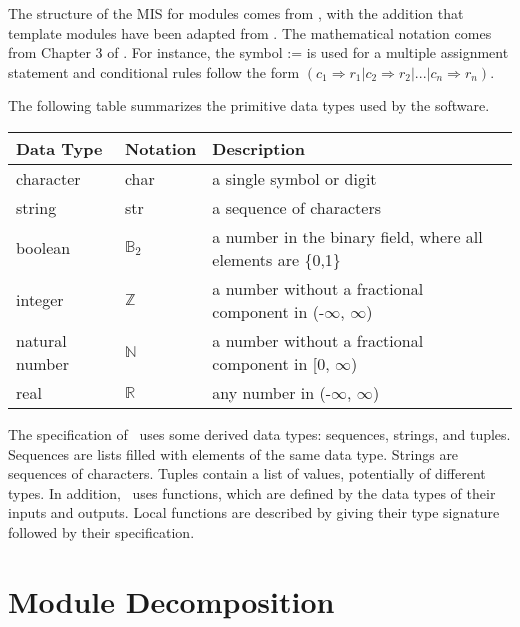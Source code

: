 \documentclass[12pt, titlepage]{article}
\begin{document}

The structure of the MIS for modules comes from \citet{HoffmanAndStrooper1995},
with the addition that template modules have been adapted from
\cite{GhezziEtAl2003}.  The mathematical notation comes from Chapter 3 of
\citet{HoffmanAndStrooper1995}.  For instance, the symbol := is used for a
multiple assignment statement and conditional rules follow the form $(c_1
\Rightarrow r_1 | c_2 \Rightarrow r_2 | ... | c_n \Rightarrow r_n )$.

The following table summarizes the primitive data types used by the \progname software. 

\begin{center}
\renewcommand{\arraystretch}{1.2}
\noindent 
\begin{tabular}{l l p{7.5cm}} 
\toprule 
\textbf{Data Type} & \textbf{Notation} & \textbf{Description}\\ 
\midrule
character & char & a single symbol or digit\\
string & str & a sequence of characters\\
boolean & $\mathbb{B}_{2}$ & a number in the binary field, where all elements are \{0,1\}\\
integer & $\mathbb{Z}$ & a number without a fractional component in (-$\infty$, $\infty$) \\
natural number & $\mathbb{N}$ & a number without a fractional component in [0, $\infty$) \\
real & $\mathbb{R}$ & any number in (-$\infty$, $\infty$)\\
\bottomrule
\end{tabular} 
\end{center}

\noindent
The specification of \progname \ uses some derived data types: sequences, strings, and
tuples. Sequences are lists filled with elements of the same data type. Strings
are sequences of characters. Tuples contain a list of values, potentially of
different types. In addition, \progname \ uses functions, which
are defined by the data types of their inputs and outputs. Local functions are
described by giving their type signature followed by their specification.

\section{Module Decomposition}
\end{document}
